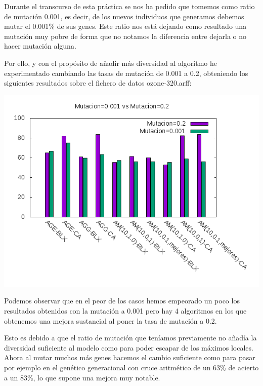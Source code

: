 \documentclass[12pt,a4paper]{article}
\begin{document}
	Durante el transcurso de esta práctica se nos ha pedido que tomemos como ratio de mutación 0.001, es decir, de los nuevos individuos que generamos debemos mutar el 0.001\% de sus genes. Este ratio nos está dejando como resultado una mutación muy pobre de forma que no notamos la diferencia entre dejarla o no hacer mutación alguna.
	
	Por ello, y con el propósito de añadir más diversidad al algoritmo he experimentado cambiando las tasas de mutación de 0.001 a 0.2, obteniendo los siguientes resultados sobre el fichero de datos ozone-320.arff:
	
	\includegraphics[scale=1]{../Graficas/Imagenes/Mutacion/mutacion.png}

	Podemos observar que en el peor de los casos hemos empeorado un poco los resultados obtenidos con la mutación a 0.001 pero hay 4 algoritmos en los que obtenemos una mejora sustancial al poner la tasa de mutación a 0.2.
	
	Esto es debido a que el ratio de mutación que teníamos previamente no añadía la diversidad suficiente al modelo como para poder escapar de los máximos locales. Ahora al mutar muchos más genes hacemos el cambio suficiente como para pasar por ejemplo en el genético generacional con cruce aritmético de un 63\% de acierto a un 83\%, lo que supone una mejora muy notable.
\end{document}
